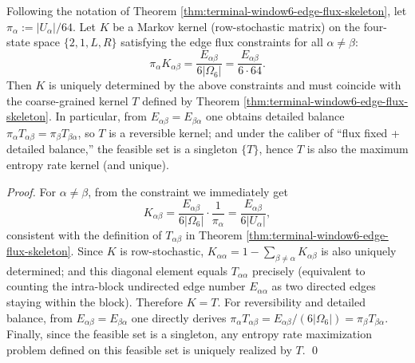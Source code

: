 \begin{corollary}\label{cor:window6-edge-flux-max-entropy-kernel-uniqueness}
Following the notation of Theorem \ref{thm:terminal-window6-edge-flux-skeleton}, let \(\pi_\alpha:=|U_\alpha|/64\).
Let \(K\) be a Markov kernel (row-stochastic matrix) on the four-state space \(\{2,1,L,R\}\) satisfying the edge flux constraints for all \(\alpha\neq\beta\):
\[
\pi_\alpha K_{\alpha\beta}=\frac{E_{\alpha\beta}}{6|\Omega_6|}=\frac{E_{\alpha\beta}}{6\cdot 64}.
\]
Then \(K\) is uniquely determined by the above constraints and must coincide with the coarse-grained kernel \(T\) defined by Theorem \ref{thm:terminal-window6-edge-flux-skeleton}.
In particular, from \(E_{\alpha\beta}=E_{\beta\alpha}\) one obtains detailed balance
\(
\pi_\alpha T_{\alpha\beta}=\pi_\beta T_{\beta\alpha}
\), so \(T\) is a reversible kernel; and under the caliber of ``flux fixed + detailed balance,'' the feasible set is a singleton \(\{T\}\), hence \(T\) is also the maximum entropy rate kernel (and unique).
\end{corollary}
\begin{proof}
For \(\alpha\neq\beta\), from the constraint we immediately get
\[
K_{\alpha\beta}=\frac{E_{\alpha\beta}}{6|\Omega_6|}\cdot\frac{1}{\pi_\alpha}
=\frac{E_{\alpha\beta}}{6|U_\alpha|},
\]
consistent with the definition of \(T_{\alpha\beta}\) in Theorem \ref{thm:terminal-window6-edge-flux-skeleton}.
Since \(K\) is row-stochastic,
\(
K_{\alpha\alpha}=1-\sum_{\beta\neq\alpha}K_{\alpha\beta}
\)
is also uniquely determined; and this diagonal element equals \(T_{\alpha\alpha}\) precisely (equivalent to counting the intra-block undirected edge number \(E_{\alpha\alpha}\) as two directed edges staying within the block).
Therefore \(K=T\).
For reversibility and detailed balance, from \(E_{\alpha\beta}=E_{\beta\alpha}\) one directly derives
\(
\pi_\alpha T_{\alpha\beta}=E_{\alpha\beta}/(6|\Omega_6|)=\pi_\beta T_{\beta\alpha}
\).
Finally, since the feasible set is a singleton, any entropy rate maximization problem defined on this feasible set is uniquely realized by \(T\). \qed
\end{proof}

